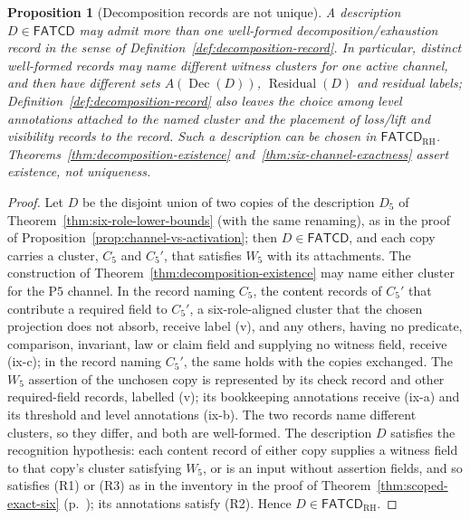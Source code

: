 \documentclass[11pt]{article}
\newtheorem{proposition}[theorem]{Proposition}
\theoremstyle{definition}
\newcommand{\FATCD}{\ensuremath{\mathsf{FATCD}}}
\newcommand{\Dec}[1]{\ensuremath{\operatorname{Dec}\!\left(#1\right)}}
\newcommand{\Residual}[1]{\ensuremath{\operatorname{Residual}\!\left(#1\right)}}
\newcommand{\Pfive}{\ensuremath{\mathrm{P5}}}
\begin{document}
\begin{proposition}[Decomposition records are not unique]\label{prop:non-uniqueness}
A description \(D \in \FATCD{}\) may admit more than one well-formed
decomposition/exhaustion record in the sense of
Definition~\ref{def:decomposition-record}. In particular, distinct
well-formed records may name different witness clusters for one active
channel, and then have different sets \(A(\Dec{D})\), \(\Residual{D}\) and
residual labels; Definition~\ref{def:decomposition-record} also leaves the choice among
level annotations attached to the named cluster and the placement of
loss/lift and visibility records to the record. Such a description can be chosen in \(\FATCD_{\mathrm{RH}}\).
Theorems~\ref{thm:decomposition-existence}
and~\ref{thm:six-channel-exactness} assert existence, not uniqueness.
\end{proposition}

\begin{proof}
Let \(D\) be the disjoint union of two copies of the description \(D_5\) of
Theorem~\ref{thm:six-role-lower-bounds} (with the same renaming), as in the proof of
Proposition~\ref{prop:channel-vs-activation}; then \(D\in\FATCD{}\), and each
copy carries a cluster, \(C_5\) and \(C_5'\), that satisfies \(W_5\) with its
attachments. The construction of Theorem~\ref{thm:decomposition-existence}
may name either cluster for the \Pfive{} channel. In the record naming
\(C_5\), the content records of \(C_5'\) that contribute a required field to
\(C_5'\), a six-role-aligned cluster that the chosen projection does not
absorb, receive label (v), and any others, having no predicate, comparison,
invariant, law or claim field and supplying no witness field, receive (ix-c); in the record naming \(C_5'\), the same holds with the
copies exchanged. The \(W_5\) assertion of the unchosen copy is represented by
its check record and other required-field records, labelled (v); its
bookkeeping annotations receive (ix-a) and its threshold and level annotations
(ix-b).
The two records name different clusters, so they differ, and both are
well-formed. The description \(D\) satisfies the recognition hypothesis: each
content record of either copy supplies a witness field to that copy's cluster
satisfying \(W_5\), or is an input without assertion fields, and so satisfies
(R1) or (R3) as in the inventory in the proof of
Theorem~\ref{thm:scoped-exact-six} (p.~\pageref{thm:scoped-exact-six}); its annotations satisfy (R2). Hence
\(D\in\FATCD_{\mathrm{RH}}\).
\end{proof}
\end{document}

